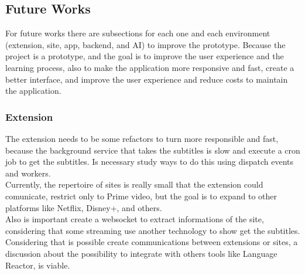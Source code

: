 \documentclass[12pt]{article}
\begin{document}
\subsection{Future Works}

For future works there are subsections for each one and each environment (extension, site, app, backend, and AI) to improve the prototype. Because the project is a prototype, and the goal is to improve the user experience and the learning process, also to make the application more responsive and fast, create a better interface, and improve the user experience and reduce costs to maintain the application.

\subsubsection{Extension}
The extension needs to be some refactors to turn more responsible and fast, because the background service that takes the subtitles is slow and execute a cron job to get the subtitles. Is necessary study ways to do this using dispatch events and workers. \\
Currently, the repertoire of sites is really small that the extension could comunicate, restrict only to Prime video, but the goal is to expand to other platforms like Netflix, Disney+, and others. \\
Also is important create a websocket to extract informations of the site, considering that some streaming use another technology to show get the subtitles. \\
Considering that is possible create communications between extensions or sites, a discussion about the possibility to integrate with others tools like Language Reactor, is viable.
\end{document}
